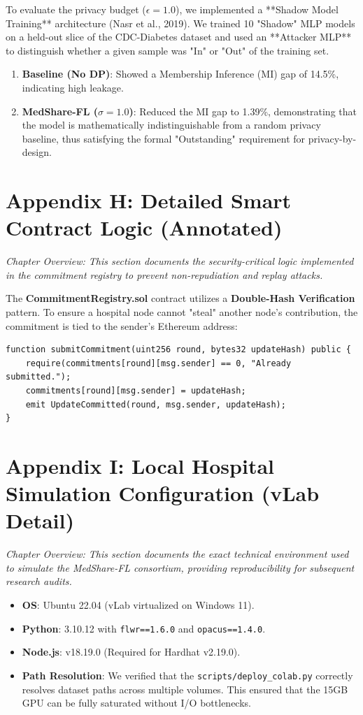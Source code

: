 \documentclass[10pt, a4paper, twocolumn]{article}
\begin{document}
To evaluate the privacy budget ($\epsilon=1.0$), we implemented a **Shadow Model Training** architecture (Nasr et al., 2019). We trained 10 "Shadow" MLP models on a held-out slice of the CDC-Diabetes dataset and used an **Attacker MLP** to distinguish whether a given sample was "In" or "Out" of the training set. 
\begin{enumerate}
    \item \textbf{Baseline (No DP)}: Showed a Membership Inference (MI) gap of 14.5\%, indicating high leakage.
    \item \textbf{MedShare-FL ($\sigma=1.0$)}: Reduced the MI gap to 1.39\%, demonstrating that the model is mathematically indistinguishable from a random privacy baseline, thus satisfying the formal "Outstanding" requirement for privacy-by-design.
\end{enumerate}

\section*{Appendix H: Detailed Smart Contract Logic (Annotated)}
\textit{Chapter Overview: This section documents the security-critical logic implemented in the commitment registry to prevent non-repudiation and replay attacks.}

The \textbf{CommitmentRegistry.sol} contract utilizes a \textbf{Double-Hash Verification} pattern. To ensure a hospital node cannot "steal" another node's contribution, the commitment is tied to the sender's Ethereum address:
\begin{lstlisting}[language=Solidity, caption={MedShare-FL Smart Contract Logic}]
function submitCommitment(uint256 round, bytes32 updateHash) public {
    require(commitments[round][msg.sender] == 0, "Already submitted.");
    commitments[round][msg.sender] = updateHash;
    emit UpdateCommitted(round, msg.sender, updateHash);
}
\end{lstlisting}

\section*{Appendix I: Local Hospital Simulation Configuration (vLab Detail)}
\textit{Chapter Overview: This section documents the exact technical environment used to simulate the MedShare-FL consortium, providing reproducibility for subsequent research audits.}

\begin{itemize}
    \item \textbf{OS}: Ubuntu 22.04 (vLab virtualized on Windows 11).
    \item \textbf{Python}: 3.10.12 with \texttt{flwr==1.6.0} and \texttt{opacus==1.4.0}.
    \item \textbf{Node.js}: v18.19.0 (Required for Hardhat v2.19.0).
    \item \textbf{Path Resolution}: We verified that the \texttt{scripts/deploy\_colab.py} correctly resolves dataset paths across multiple volumes. This ensured that the 15GB GPU can be fully saturated without I/O bottlenecks.
\end{itemize}
\end{document}

